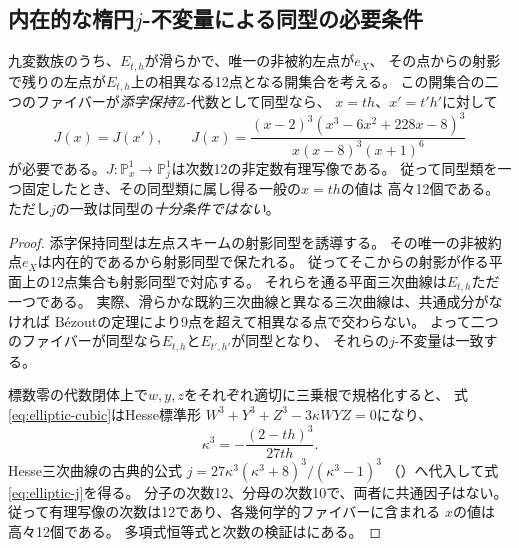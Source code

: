 \subsection{内在的な楕円$j$-不変量による同型の必要条件}
\begin{proposition}[九変数族の同型に対する明示的障害]\label{prop:elliptic-j-obstruction}
九変数族のうち、$E_{t,h}$が滑らかで、唯一の非被約左点が$e_X$、
その点からの射影で残りの左点が$E_{t,h}$上の相異なる12点となる開集合を考える。
この開集合の二つのファイバーが\emph{添字保持}$\mathbb Z$-代数として同型なら、
$x=th$、$x'=t'h'$に対して
\begin{equation}\label{eq:elliptic-j}
 J(x)=J(x'),\qquad
 J(x)=\frac{(x-2)^3(x^3-6x^2+228x-8)^3}
                 {x(x-8)^3(x+1)^6}
\end{equation}
が必要である。$J:\mathbb P^1_x\to\mathbb P^1_j$は次数12の非定数有理写像である。
従って同型類を一つ固定したとき、その同型類に属し得る一般の$x=th$の値は
高々12個である。ただし$j$の一致は同型の\emph{十分条件ではない}。
\end{proposition}
\begin{proof}
添字保持同型は左点スキームの射影同型を誘導する。
その唯一の非被約点$e_X$は内在的であるから射影同型で保たれる。
従ってそこからの射影が作る平面上の12点集合も射影同型で対応する。
それらを通る平面三次曲線は$E_{t,h}$ただ一つである。
実際、滑らかな既約三次曲線と異なる三次曲線は、共通成分がなければ
B\'ezoutの定理により9点を超えて相異なる点で交わらない。
よって二つのファイバーが同型なら$E_{t,h}$と$E_{t',h'}$が同型となり、
それらの$j$-不変量は一致する。

標数零の代数閉体上で$w,y,z$をそれぞれ適切に三乗根で規格化すると、
式\eqref{eq:elliptic-cubic}はHesse標準形
$W^3+Y^3+Z^3-3\kappa WYZ=0$になり、
\[
 \kappa^3=-\frac{(2-th)^3}{27th}.
\]
Hesse三次曲線の古典的公式
$j=27\kappa^3(\kappa^3+8)^3/(\kappa^3-1)^3$
（\cite[\S7.3, (42)]{KLV}）へ代入して式\eqref{eq:elliptic-j}を得る。
分子の次数12、分母の次数10で、両者に共通因子はない。
従って有理写像の次数は12であり、各幾何学的ファイバーに含まれる
$x$の値は高々12個である。
多項式恒等式と次数の検証はにある。
\end{proof}
